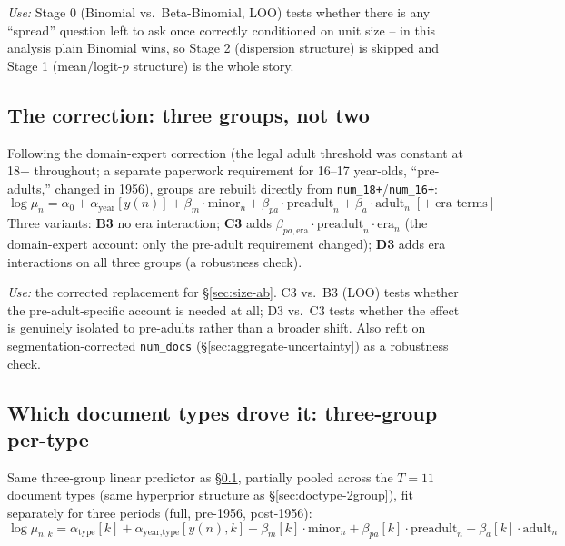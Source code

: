 \textit{Use:} Stage 0 (Binomial vs.\ Beta-Binomial, LOO) tests whether there
is any ``spread'' question left to ask once correctly conditioned on unit
size -- in this analysis plain Binomial wins, so Stage 2 (dispersion
structure) is skipped and Stage 1 (mean/logit-$p$ structure) is the whole
story.

\subsection{The correction: three groups, not two}
\label{sec:three-group}

Following the domain-expert correction (the legal adult threshold was
constant at 18+ throughout; a separate paperwork requirement for 16--17
year-olds, ``pre-adults,'' changed in 1956), groups are rebuilt directly from
\texttt{num\_18+}/\texttt{num\_16+}:
\begin{equation}
  \log\mu_n = \alpha_0 + \alpha_{\text{year}}[y(n)]
    + \beta_m\cdot\text{minor}_n + \beta_{pa}\cdot\text{preadult}_n + \beta_a\cdot\text{adult}_n
    \;[+\ \text{era terms}]
\end{equation}
Three variants: \textbf{B3} no era interaction; \textbf{C3} adds
$\beta_{pa,\text{era}}\cdot\text{preadult}_n\cdot\text{era}_n$ (the
domain-expert account: only the pre-adult requirement changed); \textbf{D3}
adds era interactions on all three groups (a robustness check).

\textit{Use:} the corrected replacement for \S\ref{sec:size-ab}. C3 vs.\ B3
(LOO) tests whether the pre-adult-specific account is needed at all; D3 vs.\
C3 tests whether the effect is genuinely isolated to pre-adults rather than a
broader shift. Also refit on segmentation-corrected \texttt{num\_docs}
(\S\ref{sec:aggregate-uncertainty}) as a robustness check.

\subsection{Which document types drove it: three-group per-type}
\label{sec:doctype-3group}

Same three-group linear predictor as \S\ref{sec:three-group}, partially
pooled across the $T=11$ document types (same hyperprior structure as
\S\ref{sec:doctype-2group}), fit separately for three periods (full,
pre-1956, post-1956):
\begin{equation}
  \log\mu_{n,k} = \alpha_{\text{type}}[k] + \alpha_{\text{year,type}}[y(n),k]
    + \beta_m[k]\cdot\text{minor}_n + \beta_{pa}[k]\cdot\text{preadult}_n + \beta_a[k]\cdot\text{adult}_n
\end{equation}


